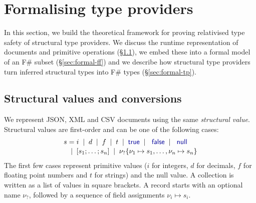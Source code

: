 \documentclass[10pt,preprint,blind,clearpagebib]{sigplanconf}
\newcommand{\kvd}[1]{\textnormal{\textcolor{kvdclr}{\sffamily #1}}}
\newcommand{\lsep}[0]{\;\; | \;\;}
\newcommand{\narrow}[1]{\hspace{-0.7em} #1 \hspace{-0.7em}}
\begin{document}
% 
%

\section{Formalising type providers}
\label{sec:formal}

In this section, we build the theoretical framework for proving relativised type safety of 
structural type providers. We discuss the runtime representation of documents and 
primitive operations (\S\ref{sec:formal-convert}), we embed these into a formal model of an F\# 
subset (\S\ref{sec:formal-ff}) and we describe how structural type providers turn
inferred structural types into F\# types (\S\ref{sec:formal-tp}).


\subsection{Structural values and conversions}
\label{sec:formal-convert}

We represent JSON, XML and CSV documents using the same \emph{structural value}. Structural 
values are first-order and can be one of the following cases:
%
\begin{equation*}
\begin{array}{lcl}
 s &\narrow{=}& i \lsep d \lsep f \lsep t \lsep \kvd{true} \lsep \kvd{false} \lsep \kvd{null} \\[0.1em]
   &\narrow{|}& [s_1; \ldots; s_n] \lsep \nu_?\{ \nu_1 \mapsto s_1, \ldots, \nu_n \mapsto s_n \}
\end{array}
\end{equation*}
%
The first few cases represent primitive values ($i$ for integers, $d$ for decimals, $f$ for floating
point numbers and $t$ for strings) and the \kvd{null} value. A collection is written as a 
list of values in square brackets. A record starts with an optional name $\nu_?$, followed by a 
sequence of field assignments $\nu_i \mapsto s_i$.
\end{document}
